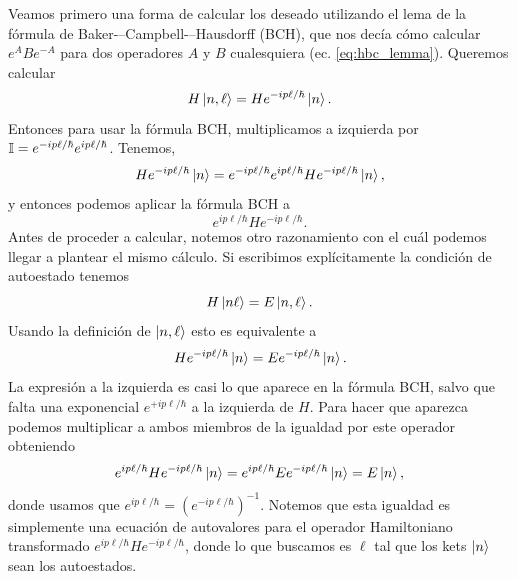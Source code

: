 \documentclass[10pt, a4paper]{article}
\numberwithin{equation}{subsection}
\begin{document}
Veamos primero una forma de calcular los deseado utilizando el lema de la
fórmula de Baker-–Campbell-–Hausdorff (BCH), que nos decía cómo calcular
$e^ABe^{-A}$ para dos operadores $A$ y $B$ cualesquiera (ec.
\eqref{eq:hbc_lemma}).
Queremos calcular
\begin{equation}
  H\ket{n,\ell} = He^{-ip\ell/\hbar}\ket{n}.
\end{equation}
Entonces para usar la fórmula BCH, multiplicamos a izquierda por $\mathbb{I} =
e^{-ip\ell/\hbar}e^{ip\ell/\hbar}$. Tenemos,
\begin{equation}
  He^{-ip\ell/\hbar}\ket{n} =
  e^{-ip\ell/\hbar}e^{ip\ell/\hbar}He^{-ip\ell/\hbar}\ket{n},
\end{equation}
y entonces podemos aplicar la fórmula BCH a
\begin{equation}
  e^{ip\ell/\hbar}He^{-ip\ell/\hbar}.
\end{equation}
Antes de proceder a calcular, notemos otro razonamiento con el cuál podemos
llegar a plantear el mismo cálculo. Si escribimos explícitamente la condición
de autoestado tenemos
\begin{equation}
  H\ket{n \ell} = E\ket{n,\ell}.
\end{equation}
Usando la definición de $\ket{n ,\ell}$ esto es equivalente a
\begin{equation}
  He^{-ip\ell/\hbar}\ket{n} = Ee^{-ip\ell/\hbar}\ket{n}.
\end{equation}
La expresión a la izquierda es casi lo que aparece en la fórmula BCH,
salvo que falta una exponencial $e^{+ip\ell/\hbar}$ a la izquierda de $H$. Para
hacer que aparezca podemos multiplicar a ambos miembros de la igualdad por este
operador obteniendo
\begin{equation}
  e^{ip\ell/\hbar}He^{-ip\ell/\hbar}\ket{n} =
  e^{ip\ell/\hbar}Ee^{-ip\ell/\hbar}\ket{n} = E\ket{n},
\end{equation}
donde usamos que $e^{ip\ell/\hbar} = \left(e^{-ip\ell/\hbar}\right)^{-1}$.
Notemos que esta igualdad es simplemente una ecuación de autovalores para el
operador Hamiltoniano transformado $e^{ip\ell/\hbar}He^{-ip\ell/\hbar}$, donde
lo que buscamos es $\ell$ tal que los kets $\ket{n}$ sean los autoestados.
\end{document}
